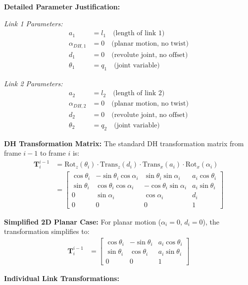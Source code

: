 \documentclass[11pt,a4paper]{article}
\begin{document}
\textbf{Detailed Parameter Justification:}

\textit{Link 1 Parameters:}
\begin{align}
a_1 &= l_1 \quad \text{(length of link 1)} \\
\alpha_{DH,1} &= 0 \quad \text{(planar motion, no twist)} \\
d_1 &= 0 \quad \text{(revolute joint, no offset)} \\
\theta_1 &= q_1 \quad \text{(joint variable)}
\end{align}

\textit{Link 2 Parameters:}
\begin{align}
a_2 &= l_2 \quad \text{(length of link 2)} \\
\alpha_{DH,2} &= 0 \quad \text{(planar motion, no twist)} \\
d_2 &= 0 \quad \text{(revolute joint, no offset)} \\
\theta_2 &= q_2 \quad \text{(joint variable)}
\end{align}

\textbf{DH Transformation Matrix:}
The standard DH transformation matrix from frame $i-1$ to frame $i$ is:
\begin{align}
\bm{T}_i^{i-1} &= \text{Rot}_{z}(\theta_i) \cdot \text{Trans}_{z}(d_i) \cdot \text{Trans}_{x}(a_i) \cdot \text{Rot}_{x}(\alpha_i) \\
&= \begin{bmatrix}
\cos\theta_i & -\sin\theta_i\cos\alpha_i & \sin\theta_i\sin\alpha_i & a_i\cos\theta_i \\
\sin\theta_i & \cos\theta_i\cos\alpha_i & -\cos\theta_i\sin\alpha_i & a_i\sin\theta_i \\
0 & \sin\alpha_i & \cos\alpha_i & d_i \\
0 & 0 & 0 & 1
\end{bmatrix}
\end{align}

\textbf{Simplified 2D Planar Case:}
For planar motion ($\alpha_i = 0$, $d_i = 0$), the transformation simplifies to:
\begin{align}
\bm{T}_i^{i-1} &= \begin{bmatrix}
\cos\theta_i & -\sin\theta_i & a_i\cos\theta_i \\
\sin\theta_i & \cos\theta_i & a_i\sin\theta_i \\
0 & 0 & 1
\end{bmatrix}
\end{align}

\textbf{Individual Link Transformations:}
\end{document}
